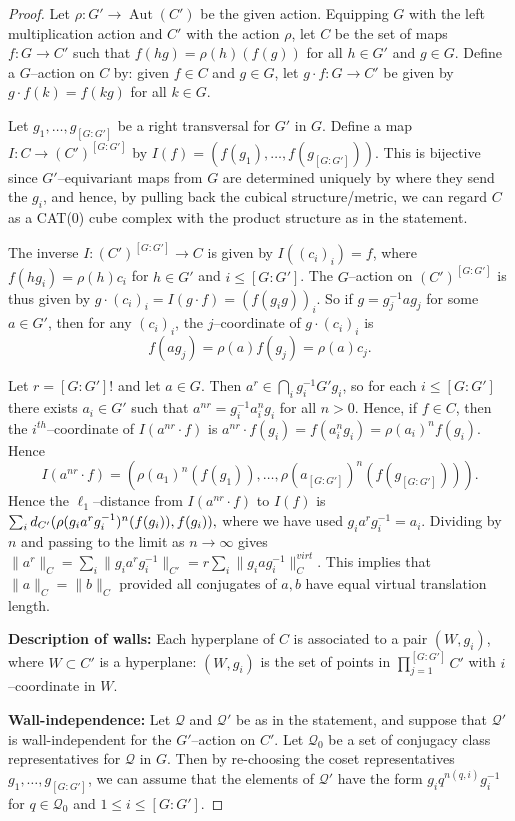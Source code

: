 \documentclass[10pt,a4paper]{amsart}
\DeclareMathOperator{\Aut}{Aut}
\newcommand{\dist}{\textup{\textsf{d}}}
\begin{document}
\begin{proof}
Let $\rho:G'\to\Aut(C')$ be the given action.  Equipping $G$ with the left multiplication action and $C'$ with the action $\rho$, let $C$ be the set of maps $f:G\to C'$ such that $f(hg)=\rho(h)(f(g))$ for all $h\in G'$ and $g\in G$.  Define a $G$--action on $C$ by: given $f\in C$ and $g\in G$, let $g\cdot f:G\to C'$ be given by $g\cdot f(k)=f(kg)$ for all $k\in G$.

Let $g_1,\ldots,g_{[G:G']}$ be a right transversal for $G'$ in $G$.  Define a map $I:C\to (C')^{[G:G']}$ by $I(f)=(f(g_1),\ldots,f(g_{[G:G']}))$.  This is bijective since $G'$--equivariant maps from $G$ are determined uniquely by where they send the $g_i$, and hence, by pulling back the cubical structure/metric, we can regard $C$ as a CAT(0) cube complex with the product structure as in the statement.


The inverse $I:(C')^{[G:G']}\to C$ is given by $I((c_i)_i)=f$, where $f(hg_i)=\rho(h)c_i$ for $h\in G'$ and $i\leq [G:G']$.  The $G$--action on $(C')^{[G:G']}$ is thus given by $g\cdot(c_i)_i=I(g\cdot f)=(f(g_ig))_i$.  So if $g=g_j^{-1}ag_j$ for some $a\in G'$, then for any $(c_i)_i$, the $j$--coordinate of $g\cdot(c_i)_i$ is $$f(ag_j)=\rho(a)f(g_j)=\rho(a)c_j.$$

Let $r=[G:G']!$ and let $a\in G$.  Then $a^r\in \bigcap_ig_i^{-1}G'g_i$, so for each $i\leq [G:G']$ there exists $a_i\in G'$ such that $a^{nr}=g_i^{-1}a_i^ng_i$ for all $n>0$.  Hence, if $f\in C$, then the $i^{th}$--coordinate of $I(a^{nr}\cdot f)$ is $a^{nr}\cdot f(g_i)=f(a_i^ng_i)=\rho(a_i)^nf(g_i)$.  Hence
$$I(a^{nr}\cdot f)=(\rho(a_1)^n(f(g_1)),\ldots,\rho(a_{[G:G']})^n(f(g_{[G:G']}))).$$
Hence the $\ell_1$--distance from $I(a^{nr}\cdot f)$ to $I(f)$ is 
$\sum_i\dist_{C'}(\rho(g_ia^{r}g_i^{-1})^n(f(g_i)),f(g_i)),$
where we have used $g_ia^rg_i^{-1}=a_i$. Dividing by $n$ and passing to the limit as $n\to\infty$ gives $\|a^r\|_C=\sum_i\|g_ia^rg_i^{-1}\|_{C'}=r\sum_i\|g_iag_i^{-1}\|^{virt}_C.$  This implies that $\|a\|_C=\|b\|_C$ provided all conjugates of $a,b$ have equal virtual translation length.

\textbf{Description of walls:}  Each hyperplane of $C$ is associated to a pair $(W,g_i)$, where $W\subset C'$ is a hyperplane: $(W,g_i)$ is the set of points in $\prod_{j=1}^{[G:G']}C'$ with $i$--coordinate in $W$.  

\textbf{Wall-independence:}  Let $\mathcal Q$ and $\mathcal Q'$ be as in the statement, and suppose that $\mathcal Q'$ is wall-independent for the $G'$--action on $C'$.  Let $\mathcal Q_0$ be a set of conjugacy class representatives for $\mathcal Q$ in $G$.  Then by re-choosing the coset representatives $g_1,\ldots,g_{[G:G']}$, we can assume that the elements of $\mathcal Q'$ have the form $g_iq^{n(q,i)}g_i^{-1}$ for $q\in\mathcal Q_0$ and $1\leq i\leq [G:G']$.  


\end{proof}
\end{document}
